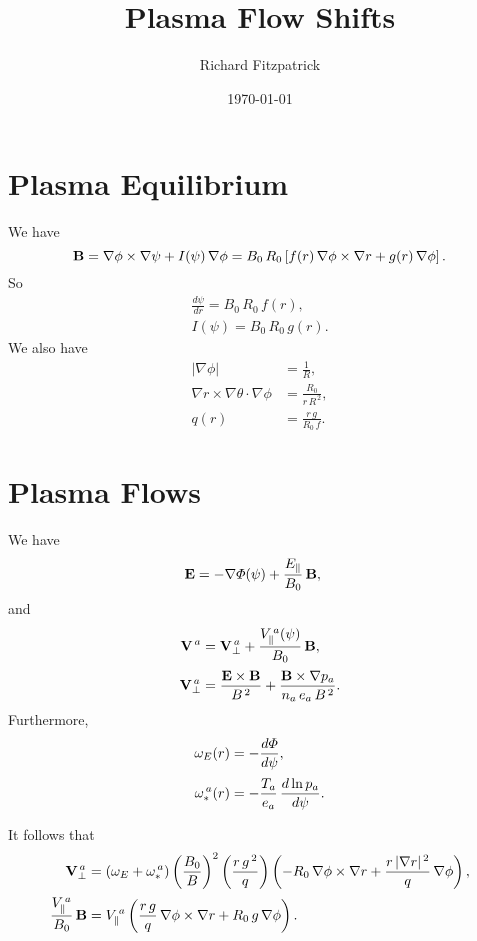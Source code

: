 \documentclass[notitlepage,12pt]{article}
\title{\bf Plasma Flow Shifts}
\date{\today}
\author{Richard Fitzpatrick}
\begin{document}
\maketitle

\section{Plasma Equilibrium}
We have
\begin{equation}
{\bf B} = \nabla\phi\times\nabla\psi + I(\psi)\,\nabla\phi = B_0\,R_0\left[f(r)\,\nabla\phi\times \nabla r+g(r)\,\nabla\phi\right].
\end{equation}
So
\begin{align}
\frac{d\psi}{dr}= B_0\,R_0\,f(r),\\[0.5ex]
I(\psi) = B_0\,R_0\,g(r).
\end{align}
We also have
\begin{align}
|\nabla\phi| &= \frac{1}{R},\\[0.5ex]
\nabla r\times \nabla\theta\cdot\nabla\phi &= \frac{R_0}{r\,R^{\,2}},\\[0.5ex]
q(r)&= \frac{r\,g}{R_0\,f}.
\end{align}

\section{Plasma Flows}
We have
\begin{align}
{\bf E}& = - \nabla{\mit\Phi}(\psi) + \frac{E_\parallel}{B_0}\,{\bf B},
\end{align}
and
\begin{align}
{\bf V}^{\,a} &= {\bf V}_\perp^{\,a} + \frac{V_\parallel^{\,a}(\psi)}{B_0}\,{\bf B},\\[0.5ex]
{\bf V}_\perp^{\,a} &= \frac{{\bf E}\times {\bf B}}{B^{\,2}} + \frac{{\bf B}\times \nabla p_a}{n_a\,e_a\,B^{\,2}}.
\end{align}
Furthermore,
\begin{align}
\omega_E(r) &= - \frac{d{\mit\Phi}}{d\psi},\\[0.5ex]
\omega_\ast^{\,a}(r)&= - \frac{T_a}{e_a}\,\frac{d\ln p_a}{d\psi}.
\end{align}

It follows that
\begin{align}
{\bf V}_\perp^{\,a} &= (\omega_E+\omega_\ast^{\,a})\left(\frac{B_0}{B}\right)^2\left(\frac{r\,g^{\,2}}{q}\right)
\left(-R_0\,\nabla\phi\times \nabla r + \frac{r\,|\nabla r|^{\,2}}{q}\,\nabla\phi\right),\\[0.5ex]
\frac{V_\parallel^{\,a}}{B_0}\,{\bf B} &= V_\parallel^{\,a}\left(\frac{r\,g}{q}\,\nabla\phi\times \nabla r + R_0\,g\,\nabla\phi\right).
\end{align}
\end{document}
